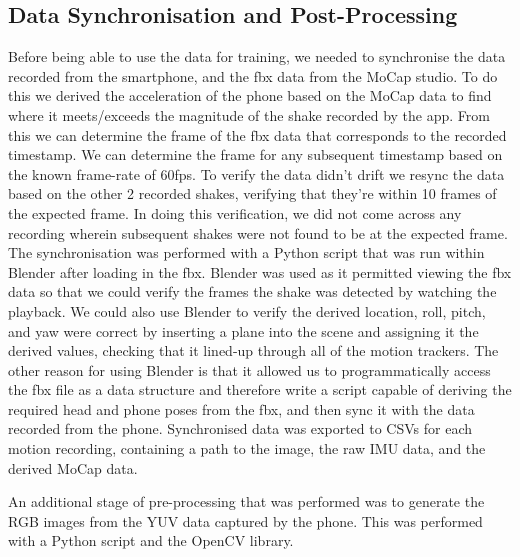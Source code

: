\subsection{Data Synchronisation and Post-Processing}
Before being able to use the data for training, we needed to synchronise the data recorded from the smartphone, and the fbx data from the MoCap studio.
To do this we derived the acceleration of the phone based on the MoCap data to find where it meets/exceeds the magnitude of the shake recorded by the app. From this we can determine the frame of the fbx data that corresponds to the recorded timestamp. We can determine the frame for any subsequent timestamp based on the known frame-rate of 60fps. 
To verify the data didn't drift we resync the data based on the other 2 recorded shakes, verifying that they're within 10 frames of the expected frame. In doing this verification, we did not come across any recording wherein subsequent shakes were not found to be at the expected frame.
The synchronisation was performed with a Python script that was run within Blender after loading in the fbx.
Blender was used as it permitted viewing the fbx data so that we could verify the frames the shake was detected by watching the playback. We could also use Blender to verify the derived location, roll, pitch, and yaw were correct by inserting a plane into the scene and assigning it the derived values, checking that it lined-up through all of the motion trackers.
The other reason for using Blender is that it allowed us to programmatically access the fbx file as a data structure and therefore write a script capable of deriving the required head and phone poses from the fbx, and then sync it with the data recorded from the phone.
Synchronised data was exported to CSVs for each motion recording, containing a path to the image, the raw IMU data, and the derived MoCap data.

An additional stage of pre-processing that was performed was to generate the RGB images from the YUV data captured by the phone. This was performed with a Python script and the OpenCV library.